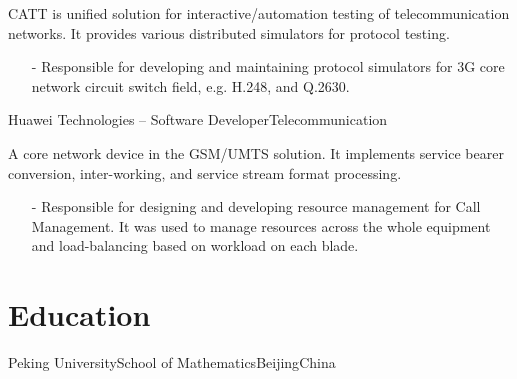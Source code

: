 \documentclass[10pt,a4paper]{moderncv}
\begin{document}
\vspace*{0.2\baselineskip}
{
  CATT is unified solution for interactive/automation testing of telecommunication networks. It provides various distributed simulators for protocol testing.
  \begin{itemize}
    \item[-] Responsible for developing and maintaining protocol simulators for 3G core network circuit switch field, e.g. H.248, and Q.2630.
  \end{itemize}
}
\vspace*{0.2\baselineskip}
\vspace*{0.2\baselineskip}
{Huawei Technologies -- Software Developer}{Telecommunication}{}{}{}

{
  A core network device in the GSM/UMTS solution. It implements service bearer conversion, inter-working,  and service stream format processing.
  \begin{itemize}
    \item[-] Responsible for designing and developing resource management for Call Management. It was used to manage resources across the whole equipment and load-balancing based on workload on each blade.
  \end{itemize}
}


\section{Education}
\vspace*{0.2\baselineskip}
{Peking University}{School of Mathematics}{Beijing}{China}{}
\vspace*{0.2\baselineskip}
\end{document}
